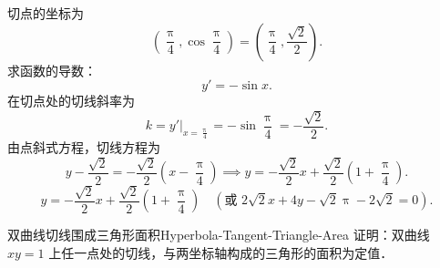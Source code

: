 \begin{solution}
    切点的坐标为
    \begin{equation}
        \left( \frac{\uppi}{4}, \cos\frac{\uppi}{4} \right) = \left( \frac{\uppi}{4}, \frac{\sqrt{2}}{2} \right).
    \end{equation}
    求函数的导数：
    \begin{equation}
        y' = -\sin x.
    \end{equation}
    在切点处的切线斜率为
    \begin{equation}
        k = \left. y' \right|_{x=\frac{\uppi}{4}} = -\sin\frac{\uppi}{4} = -\frac{\sqrt{2}}{2}.
    \end{equation}
    由点斜式方程，切线方程为
    \begin{equation}
        y - \frac{\sqrt{2}}{2} = -\frac{\sqrt{2}}{2} \left( x - \frac{\uppi}{4} \right) \implies y = -\frac{\sqrt{2}}{2}x + \frac{\sqrt{2}}{2}\left( 1 + \frac{\uppi}{4} \right).
    \end{equation}
    \begin{equation}
        \boxed{y = -\frac{\sqrt{2}}{2}x + \frac{\sqrt{2}}{2}\left( 1 + \frac{\uppi}{4} \right) \quad \left(\text{或 } 2\sqrt{2}x + 4y - \sqrt{2}\uppi - 2\sqrt{2} = 0\right).}
    \end{equation}
\end{solution}

\begin{problem}{双曲线切线围成三角形面积}{Hyperbola-Tangent-Triangle-Area}
    证明：双曲线 $xy = 1$ 上任一点处的切线，与两坐标轴构成的三角形的面积为定值．
\end{problem}

